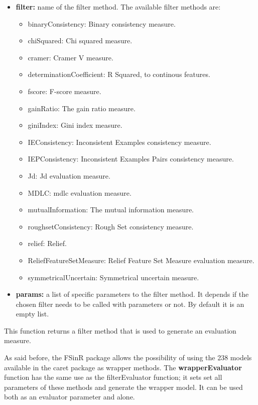 \begin{itemize}
    \item \textbf{filter:} name of the filter method. The available filter methods are:
    
    \begin{itemize}
        \item binaryConsistency: Binary consistency measure.
        \item chiSquared: Chi squared measure.
        \item cramer: Cramer V measure.
        \item determinationCoefficient: R Squared, to continous features.
        \item fscore: F-score measure.
        \item gainRatio: The gain ratio measure.
        \item giniIndex: Gini index measure.
        \item IEConsistency: Inconsistent Examples consistency measure.
        \item IEPConsistency: Inconsistent Examples Pairs consistency measure.
        \item Jd: Jd evaluation measure.
        \item MDLC: \acrshort{mdlc} evaluation measure.
        \item mutualInformation: The mutual information measure.
        \item roughsetConsistency: Rough Set consistency measure.
        \item relief: Relief.
        \item ReliefFeatureSetMeasure: Relief Feature Set Measure evaluation measure.
        \item symmetricalUncertain: Symmetrical uncertain measure.
    \end{itemize}
    
    \item \textbf{params:} a list of specific parameters to the filter method. It depends if the chosen filter needs to be called with parameters or not. By default it is an empty list.
\end{itemize}

This function returns a filter method that is used to generate an evaluation measure.

As said before, the FSinR package allows the possibility of using the 238 models available in the \acrshort{caret} package as wrapper methods. The \textbf{wrapperEvaluator} function has the same use as the filterEvaluator function; it sets set all parameters of these methods and generate the wrapper model. It can be used both as an evaluator parameter and alone.

